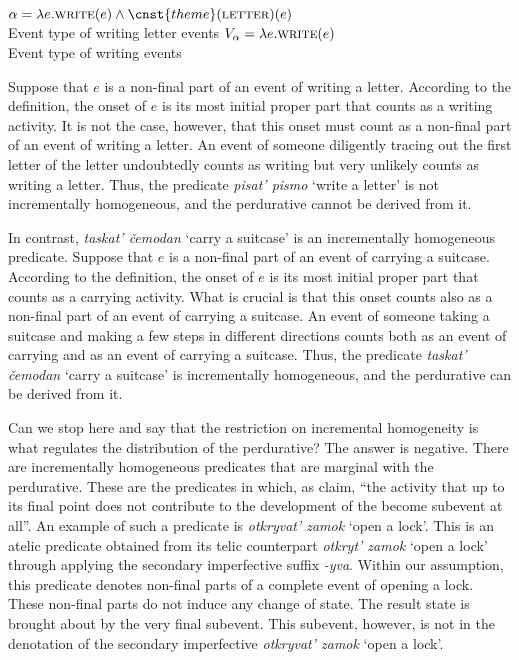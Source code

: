 \documentclass[output=paper,
]{langscibook}
\begin{document}
\ea \label{ex:naumov:31} \ea
 $\alpha = \lambda e. \textsc{write}(e) \wedge \cnst{theme}(\textsc{letter})(e)$ \\
    Event type of writing letter events
\ex $V_\alpha = \lambda e. \textsc{write}(e)$ \\
    Event type of writing events
\z \z

\noindent Suppose that $e$ is a non-final part of an event of writing a letter. According to the definition, the onset of $e$ is its most initial proper part that counts as a writing activity. It is not the case, however, that this onset must count as a non-final part of an event of writing a letter. An event of someone diligently tracing out the first letter of the letter undoubtedly counts as writing but very unlikely counts as writing a letter. Thus, the predicate \textit{pisat’ pismo} `write a letter’ is not incrementally homogeneous, and the perdurative cannot be derived from it.

In contrast, \textit{taskat’ čemodan} `carry a suitcase’ is an incrementally homogeneous predicate. Suppose that $e$ is a non-final part of an event of carrying a suitcase. According to the definition, the onset of $e$ is its most initial proper part that counts as a carrying activity. What is crucial is that this onset counts also as a non-final part of an event of carrying a suitcase. An event of someone taking a suitcase and making a few steps in different directions counts both as an event of carrying and as an event of carrying a suitcase. Thus, the predicate\textit{ taskat’ čemodan} `carry a suitcase’ is incrementally homogeneous, and the perdurative can be derived from it.

Can we stop here and say that the restriction on incremental homogeneity is what regulates the distribution of the perdurative? The answer is negative. There are incrementally homogeneous predicates that are marginal with the perdurative. These are the predicates in which, as \citet[106]{tatevosov2009event} claim, ``the activity that up to its final point does not contribute to the development of the become subevent at all''. An example of such a predicate is \textit{otkryvat’ zamok} `open a lock’. This is an atelic predicate obtained from its telic counterpart \textit{otkryt’ zamok} `open a lock’ through applying the secondary imperfective suffix \textit{-yva}. Within our assumption, this predicate denotes non-final parts of a complete event of opening a lock. These non-final parts do not induce any change of state. The result state is brought about by the very final subevent. This subevent, however, is not in the denotation of the secondary imperfective \textit{otkryvat’ zamok} `open a lock’. 
\end{document}
